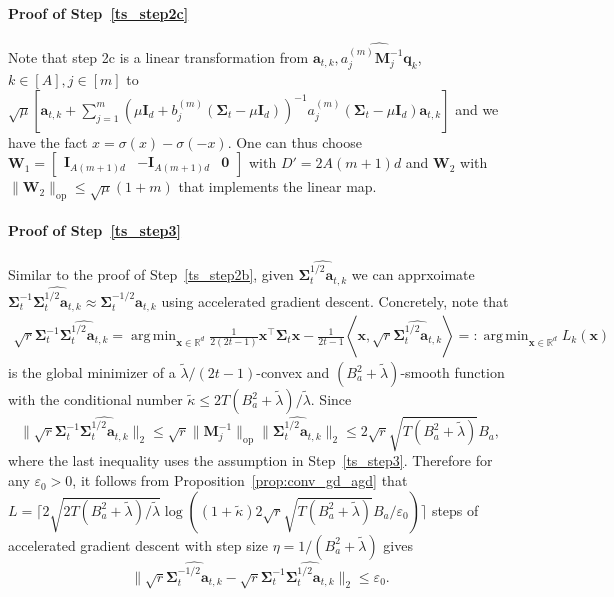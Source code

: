 \documentclass[10pt]{article}
\newcommand{\id}{\bI}
\newcommand{\eps}{\varepsilon}
\DeclareMathOperator*{\argmin}{arg\,min}
\newcommand{\lops}[1]{\|{#1}\|_{\mathrm{op}}}
\newcommand{\<}{\left\langle}
\renewcommand{\>}{\right\rangle}
\newcommand{\bzero}{{\mathbf 0}}
\newcommand{\R}{\mathbb{R}}
\newcommand{\Tpscov}{{{\mathbf\Sigma}}}
\newcommand{\Tpsparn}{{r}}
\newcommand{\prodeig}{{\mu}}
\newcommand{\padecond}{{\tilde \kappa}}
\newcommand{\intvec}{{\mathbf {q}}}
\newcommand{\intmat}{{\mathbf {M}}}
\newcommand{\hidden}{{D'}}
\def\bI{{\mathbf I}}
\def\bW{{\mathbf W}}
\def\ba{{\mathbf a}}
\def\bx{{\mathbf x}}
\begin{document}
\paragraph{Proof of Step~\ref{ts_step2c}}
Note that step 2c is a linear transformation from $\ba_{t,k},\widehat{a_j^{(m)}\intmat_j^{-1}\intvec_k}$, $k\in[A],j\in[m]$ to  $\sqrt{\prodeig} [\ba_{t,k}+\sum_{j=1}^m ({\prodeig}\id_d+{b_j^{(m)}(\Tpscov_t-\prodeig \id_d)})^{-1}{a_j^{(m)}(\Tpscov_t-\prodeig \id_d)\ba_{t,k}} ]$ and we have the fact $x=\sigma(x)-\sigma(-x)$. One can thus choose $\bW_1=\begin{bmatrix}
    \id_{A(m+1)d} & -\id_{A(m+1)d}&\bzero
\end{bmatrix}$ with $\hidden=2A(m+1)d$ and $\bW_2$ with $\lops{\bW_2}\leq \sqrt{\prodeig}(1+m)$ that implements the linear map.




\paragraph{Proof of Step~\ref{ts_step3}}
Similar to the proof of Step~\ref{ts_step2b}, given $\widehat{\Tpscov_t^{1/2}\ba_{t,k}}$ we can apprxoimate $\Tpscov_t^{-1}\widehat{\Tpscov_t^{1/2}\ba_{t,k}}\approx \Tpscov_t^{-1/2}\ba_{t,k}$ using accelerated gradient descent. Concretely, note that
\begin{align*}
   \sqrt{\Tpsparn}\Tpscov_t^{-1}\widehat{\Tpscov_t^{1/2}\ba_{t,k}} =\argmin_{\bx\in\R^d}\frac{1}{2(2t-1)}\bx^\top\Tpscov_t\bx-\frac{1}{2t-1}\<\bx,  \sqrt{\Tpsparn}\widehat{\Tpscov_t^{1/2}\ba_{t,k}}\>=:\argmin_{\bx\in\R^d} L_{k}(\bx)
\end{align*}
is the global minimizer of a $\tilde\lambda/(2t-1)$-convex and $(B_a^2+\tilde\lambda)$-smooth function with the conditional number $\padecond\leq 2T(B_a^2+\tilde\lambda)/\tilde\lambda$. Since
$$
\|\sqrt{\Tpsparn}\Tpscov_t^{-1}\widehat{\Tpscov_t^{1/2}\ba_{t,k}} \|_2\leq\sqrt{\Tpsparn}\lops{\intmat_j^{-1}}\|\widehat{\Tpscov_t^{1/2}\ba_{t,k}} \|_2\leq 2\sqrt{\Tpsparn}\sqrt{T(B_a^2+\tilde\lambda)}B_a,$$
where the last inequality uses the assumption in Step~\ref{ts_step3}.
Therefore for any $\eps_0>0$, it follows from Proposition~\ref{prop:conv_gd_agd} that
$L=\lceil2\sqrt{2 T(B_a^2+\tilde\lambda)/\tilde\lambda}\log((1+\padecond)2\sqrt{\Tpsparn}\sqrt{T(B_a^2+\tilde\lambda)}B_a/\eps_0)\rceil$ steps of accelerated gradient descent with step size $\eta=1/(B_a^2+\tilde\lambda)$ gives  $$\|\sqrt{\Tpsparn}\widehat{\Tpscov_t^{-1/2}\ba_{t,k}} -\sqrt{\Tpsparn}\Tpscov_t^{-1}\widehat{\Tpscov_t^{1/2}\ba_{t,k}} \|_2\leq\eps_0.$$
\end{document}
